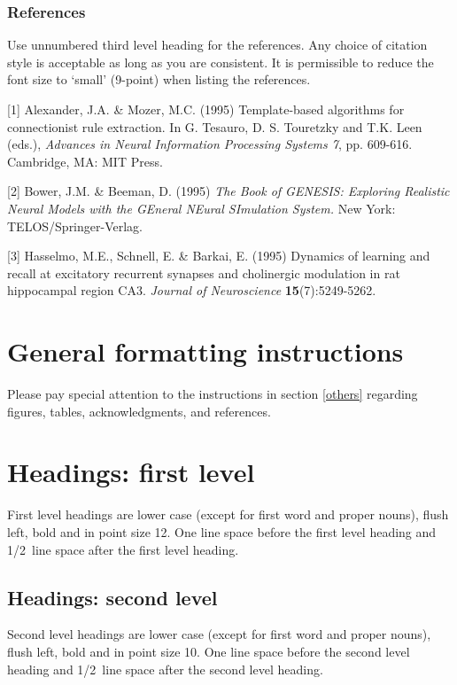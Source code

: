 \documentclass{article} %
\begin{document}
\subsubsection*{References}
Use unnumbered third level heading for
the references. Any choice of citation style is acceptable as long as you are
consistent. It is permissible to reduce the font size to `small' (9-point)
when listing the references.

\small{
[1] Alexander, J.A. \& Mozer, M.C. (1995) Template-based algorithms
for connectionist rule extraction. In G. Tesauro, D. S. Touretzky
and T.K. Leen (eds.), {\it Advances in Neural Information Processing
Systems 7}, pp. 609-616. Cambridge, MA: MIT Press.

[2] Bower, J.M. \& Beeman, D. (1995) {\it The Book of GENESIS: Exploring
Realistic Neural Models with the GEneral NEural SImulation System.}
New York: TELOS/Springer-Verlag.

[3] Hasselmo, M.E., Schnell, E. \& Barkai, E. (1995) Dynamics of learning
and recall at excitatory recurrent synapses and cholinergic modulation
in rat hippocampal region CA3. {\it Journal of Neuroscience}
{\bf 15}(7):5249-5262.
}


\section{General formatting instructions}
\label{gen_inst}

Please pay special attention to the instructions in section \ref{others}
regarding figures, tables, acknowledgments, and references.

\section{Headings: first level}
\label{headings}

First level headings are lower case (except for first word and proper nouns),
flush left, bold and in point size 12. One line space before the first level
heading and 1/2~line space after the first level heading.

\subsection{Headings: second level}

Second level headings are lower case (except for first word and proper nouns),
flush left, bold and in point size 10. One line space before the second level
heading and 1/2~line space after the second level heading.
\end{document}
